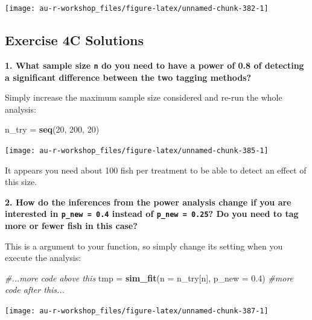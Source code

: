 \documentclass[]{book}
\newenvironment{Shaded}{\begin{snugshade}}{\end{snugshade}}
\newcommand{\KeywordTok}[1]{\textcolor[rgb]{0.13,0.29,0.53}{\textbf{#1}}}
\newcommand{\DataTypeTok}[1]{\textcolor[rgb]{0.13,0.29,0.53}{#1}}
\newcommand{\DecValTok}[1]{\textcolor[rgb]{0.00,0.00,0.81}{#1}}
\newcommand{\FloatTok}[1]{\textcolor[rgb]{0.00,0.00,0.81}{#1}}
\newcommand{\StringTok}[1]{\textcolor[rgb]{0.31,0.60,0.02}{#1}}
\newcommand{\CommentTok}[1]{\textcolor[rgb]{0.56,0.35,0.01}{\textit{#1}}}
\newcommand{\NormalTok}[1]{#1}
\theoremstyle{definition}
\theoremstyle{definition}
\theoremstyle{definition}
\theoremstyle{remark}
\begin{document}
\begin{center}\texttt{[image: au-r-workshop\_files/figure-latex/unnamed-chunk-382-1]} \end{center}

\hypertarget{ex4c-answers}{\subsection*{Exercise 4C
Solutions}\label{ex4c-answers}}

\textbf{1. What sample size \texttt{n} do you need to have a power of
0.8 of detecting a significant difference between the two tagging
methods?}

Simply increase the maximum sample size considered and re-run the whole
analysis:

\begin{Shaded}
\begin{Highlighting}[]
\NormalTok{n_try =}\StringTok{ }\KeywordTok{seq}\NormalTok{(}\DecValTok{20}\NormalTok{, }\DecValTok{200}\NormalTok{, }\DecValTok{20}\NormalTok{)}
\end{Highlighting}
\end{Shaded}

\begin{center}\texttt{[image: au-r-workshop\_files/figure-latex/unnamed-chunk-385-1]} \end{center}

It appears you need about 100 fish per treatment to be able to detect an
effect of this size.

\textbf{2. How do the inferences from the power analysis change if you
are interested in \texttt{p\_new\ =\ 0.4} instead of
\texttt{p\_new\ =\ 0.25}? Do you need to tag more or fewer fish in this
case?}

This is a argument to your function, so simply change its setting when
you execute the analysis:

\begin{Shaded}
\begin{Highlighting}[]
\CommentTok{#...more code above this}
\NormalTok{tmp =}\StringTok{ }\KeywordTok{sim_fit}\NormalTok{(}\DataTypeTok{n =}\NormalTok{ n_try[n], }\DataTypeTok{p_new =} \FloatTok{0.4}\NormalTok{)}
\CommentTok{#more code after this...}
\end{Highlighting}
\end{Shaded}

\begin{center}\texttt{[image: au-r-workshop\_files/figure-latex/unnamed-chunk-387-1]} \end{center}
\end{document}
